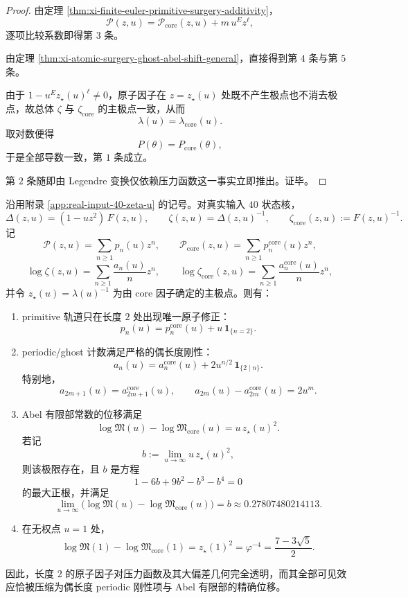 \begin{proof}
由定理 \ref{thm:xi-finite-euler-primitive-surgery-additivity}，
\[
\mathcal P(z,u)=\mathcal P_{\mathrm{core}}(z,u)+m\,u^Ez^\ell,
\]
逐项比较系数即得第 \(3\) 条。

由定理 \ref{thm:xi-atomic-surgery-ghost-abel-shift-general}，直接得到第 \(4\) 条与第 \(5\) 条。

由于 \(1-u^Ez_\star(u)^\ell\neq 0\)，原子因子在 \(z=z_\star(u)\) 处既不产生极点也不消去极点，故总体 \(\zeta\) 与
\(\zeta_{\mathrm{core}}\) 的主极点一致，从而
\[
\lambda(u)=\lambda_{\mathrm{core}}(u).
\]
取对数便得
\[
P(\theta)=P_{\mathrm{core}}(\theta),
\]
于是全部导数一致，第 \(1\) 条成立。

第 \(2\) 条随即由 Legendre 变换仅依赖压力函数这一事实立即推出。证毕。
\end{proof}
\begin{theorem}\label{thm:xi-real-input40-evenlength-abel-shift-rigidity}
沿用附录 \ref{app:real-input-40-zeta-u} 的记号。对真实输入 \(40\) 状态核，
\[
\Delta(z,u)=(1-uz^2)\,F(z,u),
\qquad
\zeta(z,u)=\Delta(z,u)^{-1},
\qquad
\zeta_{\mathrm{core}}(z,u):=F(z,u)^{-1}.
\]
记
\[
\mathcal P(z,u)=\sum_{n\ge 1}p_n(u)z^n,
\qquad
\mathcal P_{\mathrm{core}}(z,u)=\sum_{n\ge 1}p_n^{\mathrm{core}}(u)z^n,
\]
\[
\log\zeta(z,u)=\sum_{n\ge 1}\frac{a_n(u)}{n}z^n,
\qquad
\log\zeta_{\mathrm{core}}(z,u)=\sum_{n\ge 1}\frac{a_n^{\mathrm{core}}(u)}{n}z^n,
\]
并令 \(z_\star(u)=\lambda(u)^{-1}\) 为由 core 因子确定的主极点。则有：
\begin{enumerate}
  \item primitive 轨道只在长度 \(2\) 处出现唯一原子修正：
  \[
  \boxed{\;
  p_n(u)=p_n^{\mathrm{core}}(u)+u\,\mathbf 1_{\{n=2\}}.\;}
  \]
  \item periodic/ghost 计数满足严格的偶长度刚性：
  \[
  \boxed{\;
  a_n(u)=a_n^{\mathrm{core}}(u)+2u^{n/2}\,\mathbf 1_{\{2\mid n\}}.\;}
  \]
  特别地，
  \[
  a_{2m+1}(u)=a_{2m+1}^{\mathrm{core}}(u),
  \qquad
  a_{2m}(u)-a_{2m}^{\mathrm{core}}(u)=2u^m.
  \]
  \item Abel 有限部常数的位移满足
  \[
  \boxed{\;
  \log\mathfrak M(u)-\log\mathfrak M_{\mathrm{core}}(u)=u\,z_\star(u)^2.\;}
  \]
  若记
  \[
  b:=\lim_{u\to\infty}u\,z_\star(u)^2,
  \]
  则该极限存在，且 \(b\) 是方程
  \[
  1-6b+9b^2-b^3-b^4=0
  \]
  的最大正根，并满足
  \[
  \boxed{\;
  \lim_{u\to\infty}
  \bigl(\log\mathfrak M(u)-\log\mathfrak M_{\mathrm{core}}(u)\bigr)=b
  \approx 0.27807480214113.\;}
  \]
  \item 在无权点 \(u=1\) 处，
  \[
  \boxed{\;
  \log\mathfrak M(1)-\log\mathfrak M_{\mathrm{core}}(1)=z_\star(1)^2
  =\varphi^{-4}
  =\frac{7-3\sqrt5}{2}.\;}
  \]
\end{enumerate}
因此，长度 \(2\) 的原子因子对压力函数及其大偏差几何完全透明，而其全部可见效应恰被压缩为偶长度 periodic 刚性项与 Abel 有限部的精确位移。
\end{theorem}
